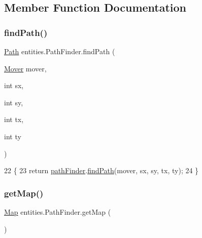 \subsection{Member Function Documentation}
\mbox{\label{classentities_1_1_path_finder_a392069295c51a6b5470585f2f956a226}} 
\subsubsection{\texorpdfstring{find\+Path()}{findPath()}}
{\footnotesize\ttfamily \mbox{\hyperlink{classorg_1_1newdawn_1_1slick_1_1util_1_1pathfinding_1_1_path}{Path}} entities.\+Path\+Finder.\+find\+Path (\begin{DoxyParamCaption}\item[{\mbox{\hyperlink{interfaceorg_1_1newdawn_1_1slick_1_1util_1_1pathfinding_1_1_mover}{Mover}}}]{mover,  }\item[{int}]{sx,  }\item[{int}]{sy,  }\item[{int}]{tx,  }\item[{int}]{ty }\end{DoxyParamCaption})\hspace{0.3cm}{\ttfamily [inline]}}


\begin{DoxyCode}
22                                                                       \{
23         \textcolor{keywordflow}{return} \mbox{\hyperlink{classentities_1_1_path_finder_a3ee55002f6ed410109207b43757e93f7}{pathFinder}}.\mbox{\hyperlink{classorg_1_1newdawn_1_1slick_1_1util_1_1pathfinding_1_1_a_star_path_finder_a603b1ac6a40ac99d3bc38740f46b2706}{findPath}}(mover, sx, sy, tx, ty);
24     \}
\end{DoxyCode}
\mbox{\label{classentities_1_1_path_finder_a130df479b259cdc0904207301454dc2f}} 
\subsubsection{\texorpdfstring{get\+Map()}{getMap()}}
{\footnotesize\ttfamily \mbox{\hyperlink{classentities_1_1_map}{Map}} entities.\+Path\+Finder.\+get\+Map (\begin{DoxyParamCaption}{ }\end{DoxyParamCaption})\hspace{0.3cm}{\ttfamily [inline]}}


